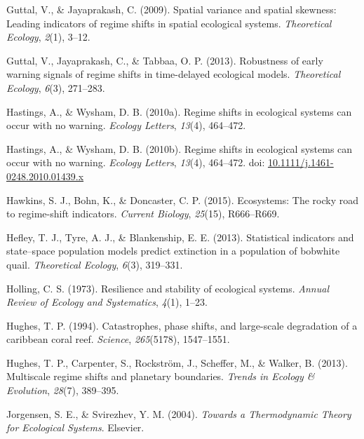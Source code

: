 \documentclass[12pt,twoside,openany]{reedthesis}
\begin{document}
\leavevmode\hypertarget{ref-guttal2009spatial}{}%
Guttal, V., \& Jayaprakash, C. (2009). Spatial variance and spatial skewness: Leading indicators of regime shifts in spatial ecological systems. \emph{Theoretical Ecology}, \emph{2}(1), 3--12.

\leavevmode\hypertarget{ref-guttal2013robustness}{}%
Guttal, V., Jayaprakash, C., \& Tabbaa, O. P. (2013). Robustness of early warning signals of regime shifts in time-delayed ecological models. \emph{Theoretical Ecology}, \emph{6}(3), 271--283.

\leavevmode\hypertarget{ref-hastings2010regime}{}%
Hastings, A., \& Wysham, D. B. (2010a). Regime shifts in ecological systems can occur with no warning. \emph{Ecology Letters}, \emph{13}(4), 464--472.

\leavevmode\hypertarget{ref-hastings_regime_2010}{}%
Hastings, A., \& Wysham, D. B. (2010b). Regime shifts in ecological systems can occur with no warning. \emph{Ecology Letters}, \emph{13}(4), 464--472. doi: \href{https://doi.org/10.1111/j.1461-0248.2010.01439.x}{10.1111/j.1461-0248.2010.01439.x}

\leavevmode\hypertarget{ref-hawkins2015ecosystems}{}%
Hawkins, S. J., Bohn, K., \& Doncaster, C. P. (2015). Ecosystems: The rocky road to regime-shift indicators. \emph{Current Biology}, \emph{25}(15), R666--R669.

\leavevmode\hypertarget{ref-hefley2013statistical}{}%
Hefley, T. J., Tyre, A. J., \& Blankenship, E. E. (2013). Statistical indicators and state--space population models predict extinction in a population of bobwhite quail. \emph{Theoretical Ecology}, \emph{6}(3), 319--331.

\leavevmode\hypertarget{ref-holling1973resilience}{}%
Holling, C. S. (1973). Resilience and stability of ecological systems. \emph{Annual Review of Ecology and Systematics}, \emph{4}(1), 1--23.

\leavevmode\hypertarget{ref-hughes_catastrophes_1994}{}%
Hughes, T. P. (1994). Catastrophes, phase shifts, and large-scale degradation of a caribbean coral reef. \emph{Science}, \emph{265}(5178), 1547--1551.

\leavevmode\hypertarget{ref-hughes2013multiscale}{}%
Hughes, T. P., Carpenter, S., Rockström, J., Scheffer, M., \& Walker, B. (2013). Multiscale regime shifts and planetary boundaries. \emph{Trends in Ecology \& Evolution}, \emph{28}(7), 389--395.

\leavevmode\hypertarget{ref-jorgensen_towards_2004}{}%
Jorgensen, S. E., \& Svirezhev, Y. M. (2004). \emph{Towards a Thermodynamic Theory for Ecological Systems}. Elsevier.
\end{document}
